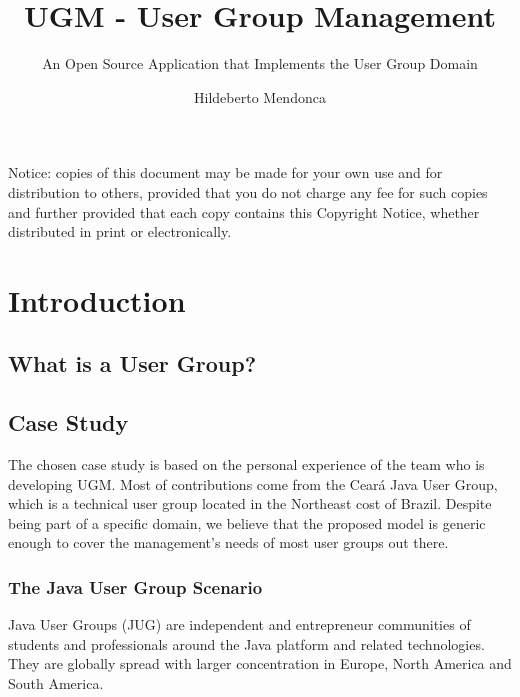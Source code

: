 \documentclass[envcountsame,envcountchap]{svmono}
\author{Hildeberto Mendonca}
\title{UGM - User Group Management}
\subtitle{An Open Source Application that Implements the User Group Domain}
\begin{document}
\maketitle

\frontmatter

\thispagestyle{empty}
\vspace*{3.5cm}
\begin{flushleft}
Notice: copies of this document may be made for your own use and for distribution to others, provided that you do not charge any fee for such copies and further provided that each copy contains this Copyright Notice, whether distributed in print or electronically.
\end{flushleft}

\tableofcontents

\listoffigures

\listoftables

\mainmatter

\chapter{Introduction}

\section{What is a User Group?}

\section{Case Study}

The chosen case study is based on the personal experience of the team who is developing UGM. Most of contributions come from the Cear\'{a} Java User Group, which is a technical user group located in the Northeast cost of Brazil. Despite being part of a specific domain, we believe that the proposed model is generic enough to cover the management's needs of most user groups out there.

\subsection{The Java User Group Scenario}

Java User Groups (JUG) are independent and entrepreneur communities of students and professionals around the Java platform and related technologies. They are globally spread with larger concentration in Europe, North America and South America.
\end{document}

